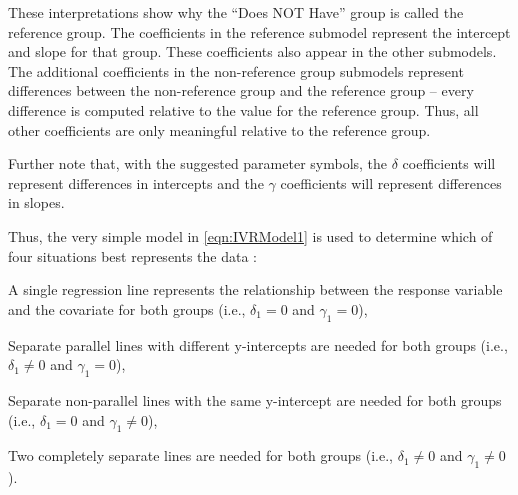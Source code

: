 \documentclass[10pt,openany]{book}\usepackage[]{graphicx}\usepackage[]{color}
\begin{document}
These interpretations show why the ``Does NOT Have'' group is called the reference group.  The coefficients in the reference submodel represent the intercept and slope for that group.  These coefficients also appear in the other submodels.  The additional coefficients in the non-reference group submodels represent differences between the non-reference group and the reference group -- every difference is computed relative to the value for the reference group.  Thus, all other coefficients are only meaningful relative to the reference group.


\vspace{-12pt}

\vspace{-12pt}

Further note that, with the suggested parameter symbols, the $\delta$ coefficients will represent differences in intercepts and the $\gamma$ coefficients will represent differences in slopes.


\vspace{-12pt}

Thus, the very simple model in \eqref{eqn:IVRModel1} is used to determine which of four situations best represents the data :
\begin{Itemize}
  \item A single regression line represents the relationship between the response variable and the covariate for both groups (i.e., $\delta_{1}=0$ and $\gamma_{1}=0$),
  \item Separate parallel lines with different y-intercepts are needed for both groups (i.e., $\delta_{1}\neq0$ and $\gamma_{1}=0$),
  \item Separate non-parallel lines with the same y-intercept are needed for both groups (i.e., $\delta_{1}=0$ and $\gamma_{1}\neq0$),
  \item Two completely separate lines are needed for both groups (i.e., $\delta_{1}\neq0$ and $\gamma_{1}\neq0$).
\end{Itemize}
\end{document}

